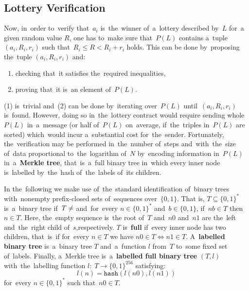 \documentclass[a4paper]{article}
\newcommand{\hash}[1]{\mathtt{hash}({#1})}
\begin{document}
\subsection{Lottery Verification}
    \label{sec:lottery-verification}
    Now, in~order to~verify that~$a_i$ is~the~winner of~a~lottery described by~$L$ for~a given random value $R$,
    one has to~make sure that~$P(L)$ contains a~tuple $(a_i, R_i, r_i)$ such that~$R_i \leq R < R_i + r_i$ holds.
    This can be done by~proposing the~tuple $(a_i, R_i, r_i)$ and:
    \begin{enumerate}
        \item checking that~it satisfies the~required inequalities,
        \item proving that~it is~an element of~$P(L)$.
    \end{enumerate}

    (1) is~trivial and~(2) can be done by~iterating over~$P(L)$ until~$(a_i, R_i, r_i)$ is~found. However,
    doing so in~the~lottery contract would require sending whole $P(L)$ in~a~message (or half of~$P(L)$ on~average,
    if~the~triples in~$P(L)$ are sorted) which~would incur a~substantial cost for~the~sender. Fortunately,
    the~verification may be performed in~the~number of~steps and~with~the~size of~data proportional to~the~logarithm
    of~$N$ by~encoding information in~$P(L)$ in~a~\textbf{Merkle tree}, that~is~a~full binary tree in~which every inner node
    is~labelled by~the~hash of~the~labels of~its children.

    In the~following we make use of~the~standard identification of~binary trees with~nonempty prefix-closed sets
    of~sequences over~$\{0,1\}$. That is, $T \subseteq \{0,1\}^*$ is~a~binary tree if~$T \neq \empty$ and~for~every
    $n \in \{0,1\}^*$ and~$b \in \{0,1\}$, if~$nb \in T$ then $n \in T$. Here, the~empty sequence is~the
    root of~$T$ and~$n0$ and~$n1$ are the~left and~the~right child of~$s$,respectively.
    $T$ is~\textbf{full} if~every inner node has two children, that~is~if for~every $n \in T$ we have $n0 \in T \iff n1 \in T$.
    A~\textbf{labelled binary tree} is~a~binary tree $T$ and~a~function $l$ from~$T$ to~some fixed set of~labels.
    Finally, a~Merkle tree is~a~\textbf{labelled full binary tree} $(T, l)$ with~the~labelling function
    $l:\; T \rightarrow \{0,1\}^{256}$ satisfying:
    \begin{displaymath}
        l(n) = \hash{l(n0), l(n1)}
    \end{displaymath}
    for~every $n \in \{0,1\}^*$ such that~$n0 \in T$.
\end{document}

